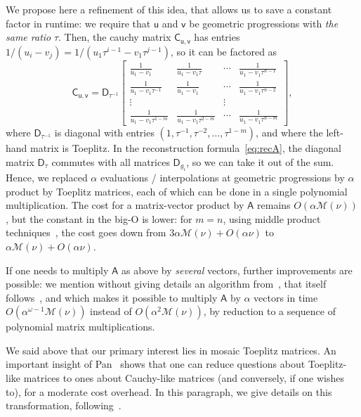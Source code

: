 \documentclass{sig-alternate}
\newcommand{\vu}{\ensuremath{\mathsf{u}}}
\newcommand{\vv}{\ensuremath{\mathsf{v}}}
\newcommand{\mA}{\ensuremath{\mathsf{A}}}
\newcommand{\mC}{\ensuremath{\mathsf{C}}}
\newcommand{\mD}{\ensuremath{\mathsf{D}}}
\newcommand{\M}{\ensuremath{\mathscr{M}}}
\newcommand{\mx}{\ensuremath{\nu}}
\begin{document}
We propose here a refinement of this idea, that allows us to
save a constant factor in runtime: we require that $\vu$ and $\vv$ be
geometric progressions with {\em the same ratio} $\tau$. Then, the
cauchy matrix $\mC_{\vu,\vv}$ has entries $1/(u_i -
v_j) = 1/(u_1 \tau^{i-1} - v_1 \tau^{j-1})$, so it can be factored as
$$\mC_{\vu,\vv}=\mD_{\tau^{-1}}
\begin{bmatrix}
\frac 1{u_1 - v_1} & \frac 1{u_1 - v_1 \tau} & \cdots & \frac 1{u_1-v_1 \tau^{n-1}}\\
\frac 1{u_1 - v_1 \tau^{-1}}  & \frac 1{u_1 - v_1} & \cdots & \frac 1{u_1-v_1 \tau^{n-2}}\\
\vdots & & \vdots \\
\frac 1{u_1 - v_1 \tau^{1-m}}  & \frac 1{u_1 - v_1 \tau^{2-m}} & \cdots & \frac 1{u_1-v_1 \tau^{n-m}}
\end{bmatrix},$$
where $\mD_{\tau^{-1}}$ is diagonal with entries
$(1,\tau^{-1},\tau^{-2},\dots,\tau^{1-m})$, and where the left-hand matrix
is Toeplitz. In the reconstruction formula~\eqref{eq:recA}, the
diagonal matrix $\mD_\tau$ commutes with all matrices $\mD_{g_i}$, so
we can take it out of the sum. Hence, we replaced $\alpha$ evaluations
/ interpolations at geometric progressions by $\alpha$ product by
Toeplitz matrices, each of which can be done in a single polynomial
multiplication. The cost for a matrix-vector product by $\mA$ remains
$O(\alpha \M(\mx))$, but the constant in the big-O is lower: for $m=n$,
using middle product techniques~\cite{HaQuZi04,BoLeSc03,BoSc05}, the
cost goes down from $3\alpha \M(\mx) +O(\alpha \mx)$ to $\alpha \M(\mx)
+O(\alpha \mx)$. 

If one needs to multiply $\mA$ as above by {\em several} vectors,
further improvements are possible: we mention without giving details
an algorithm from~\cite{BoJeMoSc16}, that itself
follows~\cite{BoJeSc08}, and which makes it possible to multiply $\mA$
by $\alpha$ vectors in time $O(\alpha^{\omega-1} \M(\mx))$ instead of
$O(\alpha^2 \M(\mx))$, by reduction to a sequence of polynomial matrix
multiplications.

\smallskip{}
We said above that our primary interest lies in mosaic
Toep\-litz matrices. An important insight of Pan~\cite{Pan90} shows
that one can reduce questions about Toeplitz-like matrices to ones
about Cauchy-like matrices (and conversely, if one wishes to), for a
moderate cost overhead. In this paragraph, we give details on 
this transformation, following~\cite[Chapter~4.8]{Pan01}.
\end{document}
